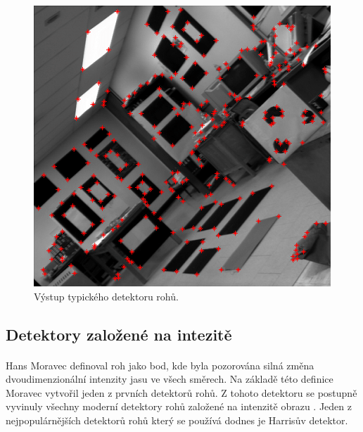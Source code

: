 \begin{figure}[h]\centering
    \centering
    \includegraphics[width=0.6\linewidth]{obrazky-figures/corner.png}
    \caption{Výstup typického detektoru rohů\protect\footnotemark{}.}
    \label{corner}
\end{figure}
\subsection*{Detektory založené na intezitě}
\paragraph{}Hans Moravec \cite{Moravec} definoval roh jako bod, kde byla pozorována silná změna dvoudimenzionální intenzity jasu ve všech směrech. Na základě této definice Moravec vytvořil jeden z prvních detektorů rohů. Z tohoto detektoru se postupně vyvinuly všechny moderní detektory rohů založené na intenzitě obrazu \cite{intensity_corner}. Jeden z nejpopulárnějších detektorů rohů který se používá dodnes je Harrisův detektor.

